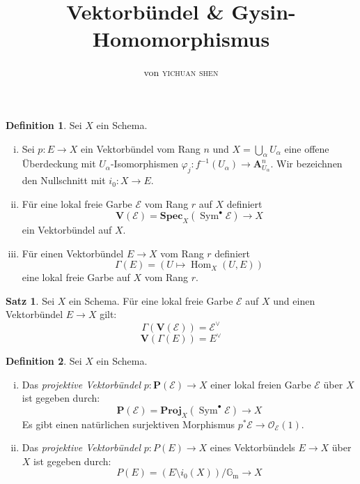 \documentclass[10pt,b5paper]{article}
\author{von \textsc{yichuan shen}}
\title{Vektorbündel \& Gysin-Homomorphismus}
\begin{document}
\theoremstyle{plain}
\theoremstyle{definition}
\newtheorem{theorem}{Theorem}
\newtheorem{lemma}[theorem]{Lemma}
\newtheorem{proposition}[theorem]{Satz}
\newtheorem{corollary}[theorem]{Korollar}
\theoremstyle{definition}
\newtheorem*{definition}{Definition}
\newtheorem*{example}{Beispiel}
\theoremstyle{remark}
\newtheorem*{remark}{Bemerkung}

\maketitle

\begin{definition}
Sei $X$ ein Schema.
\begin{enumerate}[(i)]
\item Sei $p: E\to X$ ein Vektorbündel vom Rang $n$ und $X=\bigcup_\alpha U_\alpha$ eine offene Überdeckung mit $U_\alpha$-Isomorphismen $\varphi_j: f^{-1}(U_\alpha)\to \mathbf{A}_{U_\alpha}^n$. Wir bezeichnen den Nullschnitt mit $i_0: X\to E$.
\item Für eine lokal freie Garbe $\mathcal{E}$ vom Rang $r$ auf $X$ definiert
\[ \mathbf{V}(\mathcal{E}) = \mathbf{Spec}_X(\operatorname{Sym}^\bullet\mathcal{E})\to X \]
ein Vektorbündel auf $X$.
\item Für einen Vektorbündel $E\to X$ vom Rang $r$ definiert
\[ \Gamma(E) = (U\mapsto \operatorname{Hom}_X(U, E)) \]
eine lokal freie Garbe auf $X$ vom Rang $r$.
\end{enumerate}
\end{definition}

\begin{proposition}
Sei $X$ ein Schema. Für eine lokal freie Garbe $\mathcal{E}$ auf $X$ und einen Vektorbündel $E\to X$ gilt:
\[ \Gamma(\mathbf{V}(\mathcal{E})) = \mathcal{E}^\vee \]
\[ \mathbf{V}(\Gamma(E)) = E^\vee \]
\end{proposition}

\begin{definition}
Sei $X$ ein Schema.
\begin{enumerate}[(i)]
\item Das \textit{projektive Vektorbündel} $p: \mathbf{P}(\mathcal{E})\to X$ einer lokal freien Garbe $\mathcal{E}$ über $X$ ist gegeben durch:
\[ \mathbf{P}(\mathcal{E}) = \mathbf{Proj}_X(\operatorname{Sym}^\bullet\mathcal{E})\to X \]
Es gibt einen natürlichen surjektiven Morphismus $p^\ast\mathcal{E} \to \mathcal{O}_\mathcal{E}(1)$.
\item Das \textit{projektive Vektorbündel} $p: P(E)\to X$ eines Vektorbündels $E\to X$ über $X$ ist gegeben durch:
\[ P(E) = (E\setminus i_0(X))/\mathbb{G}_\text{m}\to X \]
\end{enumerate}
\end{definition}
\end{document}
